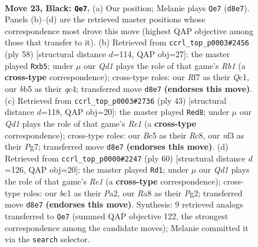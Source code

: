\documentclass[11pt]{article}
\begin{document}
\clearpage

\begin{figure}[p]\centering
\begin{subfigure}{0.46\textwidth}\centering
\resizebox{\linewidth}{!}{%
\newchessgame
\chessboard[
  setfen={r2qk3/pp3r1R/2n1Q1p1/1Bb3P1/P7/2N2N2/1P3P2/R1B1K3 b Q - 0 23},
  showmover=false,
  pgfstyle=straightmove, color=movearrow, markmove={d8-e7}
]}
\caption{}
\end{subfigure}\hfill
\begin{subfigure}{0.46\textwidth}\centering
\resizebox{\linewidth}{!}{%
\newchessgame
\chessboard[
  setfen={4rbk1/Bb3p2/5n1p/1p2p1p1/2q3P1/2N4P/4PP2/RRQ3K1 w - - 0 30},
  showmover=false,
  pgfstyle=straightmove, color=movearrow, markmove={b1-b5}
]}
\caption{}
\end{subfigure}
\\[4pt]
\begin{subfigure}{0.46\textwidth}\centering
\resizebox{\linewidth}{!}{%
\newchessgame
\chessboard[
  setfen={2r1r1k1/p2Q1ppp/1q6/3pB3/3P4/P1nbPN2/5PPP/2R1R2K b - - 3 22},
  showmover=false,
  pgfstyle=straightmove, color=movearrow, markmove={e8-d8}
]}
\caption{}
\end{subfigure}\hfill
\begin{subfigure}{0.46\textwidth}\centering
\resizebox{\linewidth}{!}{%
\newchessgame
\chessboard[
  setfen={4r1k1/1b2pp1p/p4np1/4q3/8/Q2BN3/PP3PPP/4R1K1 w - - 3 31},
  showmover=false,
  pgfstyle=straightmove, color=movearrow, markmove={e1-d1}
]}
\caption{}
\end{subfigure}
\caption{\textbf{Move 23, Black: \texttt{Qe7}.} (a) Our position; Melanie plays \texttt{Qe7} (\texttt{d8e7}). Panels (b)--(d) are the retrieved master positions whose correspondence most drove this move (highest QAP objective among those that transfer to it). (b) Retrieved from \texttt{ccrl\_top\_p0003\#2456} (ply 58) [structural distance $d$=114, QAP obj=27]: the master played \texttt{Rxb5}; under $\mu$ our \emph{Qd1} plays the role of that game's \emph{Rb1} (a \textbf{cross-type} correspondence); cross-type roles: our \emph{R}f7 as their \emph{Q}c1, our \emph{b}b5 as their \emph{q}c4; transferred move \texttt{d8e7} \textbf{(endorses this move)}. (c) Retrieved from \texttt{ccrl\_top\_p0003\#2736} (ply 43) [structural distance $d$=118, QAP obj=20]: the master played \texttt{Red8}; under $\mu$ our \emph{Qd1} plays the role of that game's \emph{Re1} (a \textbf{cross-type} correspondence); cross-type roles: our \emph{B}c5 as their \emph{R}c8, our \emph{n}f3 as their \emph{P}g7; transferred move \texttt{d8e7} \textbf{(endorses this move)}. (d) Retrieved from \texttt{ccrl\_top\_p0000\#2247} (ply 60) [structural distance $d$=126, QAP obj=20]: the master played \texttt{Rd1}; under $\mu$ our \emph{Qd1} plays the role of that game's \emph{Re1} (a \textbf{cross-type} correspondence); cross-type roles: our \emph{b}c1 as their \emph{P}a2, our \emph{R}a8 as their \emph{P}g2; transferred move \texttt{d8e7} \textbf{(endorses this move)}. Synthesis: 9 retrieved analogs transferred to \texttt{Qe7} (summed QAP objective 122, the strongest correspondence among the candidate moves); Melanie committed it via the \texttt{search} selector.}
\label{fig:thought-m45}
\end{figure}
\end{document}
